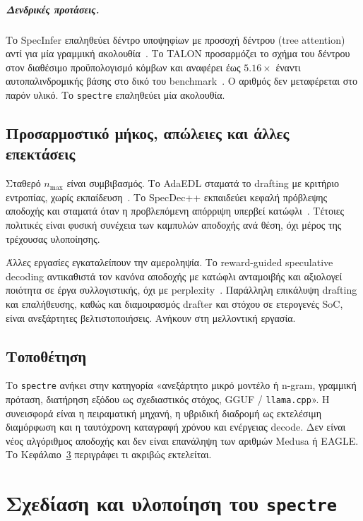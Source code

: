\documentclass[a4paper,12pt]{report}
\theoremstyle{plain}
\theoremstyle{definition}
\theoremstyle{remark}
\begin{document}
\paragraph{Δενδρικές προτάσεις.}
Το SpecInfer επαληθεύει δέντρο υποψηφίων με προσοχή δέντρου (tree attention)
αντί για μία γραμμική ακολουθία~\cite{miao2024specinfer}. Το TALON
προσαρμόζει το σχήμα
του δέντρου στον διαθέσιμο προϋπολογισμό κόμβων και αναφέρει έως
\(5.16\times\) έναντι αυτοπαλινδρομικής βάσης στο δικό του
benchmark~\cite{liu2026talon}. Ο αριθμός δεν μεταφέρεται στο παρόν υλικό. Το
\texttt{spectre} επαληθεύει μία ακολουθία.

\section{Προσαρμοστικό μήκος, απώλειες και άλλες επεκτάσεις}

Σταθερό \(n_{\max}\) είναι συμβιβασμός. Το AdaEDL σταματά το drafting με
κριτήριο εντροπίας, χωρίς εκπαίδευση~\cite{agrawal2024adaedl}. Το SpecDec++
εκπαιδεύει κεφαλή πρόβλεψης αποδοχής και σταματά όταν η προβλεπόμενη
απόρριψη υπερβεί κατώφλι~\cite{huang2024specdecpp}. Τέτοιες πολιτικές είναι
φυσική συνέχεια των καμπυλών αποδοχής ανά θέση, όχι μέρος της τρέχουσας
υλοποίησης.

Άλλες εργασίες εγκαταλείπουν την αμεροληψία. Το reward-guided speculative
decoding αντικαθιστά τον κανόνα αποδοχής με κατώφλι ανταμοιβής και αξιολογεί
ποιότητα σε έργα συλλογιστικής, όχι με
perplexity~\cite{liao2025rsd}. Παράλληλη επικάλυψη drafting και επαλήθευσης,
καθώς και διαμοιρασμός drafter και στόχου σε ετερογενές SoC, είναι
ανεξάρτητες βελτιστοποιήσεις. Ανήκουν στη μελλοντική εργασία.

\section{Τοποθέτηση}

Το \texttt{spectre} ανήκει στην κατηγορία «ανεξάρτητο μικρό μοντέλο ή n-gram,
γραμμική πρόταση, διατήρηση εξόδου ως σχεδιαστικός στόχος, GGUF /
\texttt{llama.cpp}». Η συνεισφορά είναι η πειραματική μηχανή, η υβριδική
διαδρομή ως εκτελέσιμη διαμόρφωση και η ταυτόχρονη καταγραφή χρόνου και
ενέργειας decode. Δεν είναι νέος αλγόριθμος αποδοχής και δεν είναι επανάληψη
των αριθμών Medusa ή EAGLE. Το Κεφάλαιο~\ref{ch:spectre} περιγράφει τι ακριβώς
εκτελείται.

\chapter{Σχεδίαση και υλοποίηση του \texttt{spectre}}
\label{ch:spectre}
\end{document}
